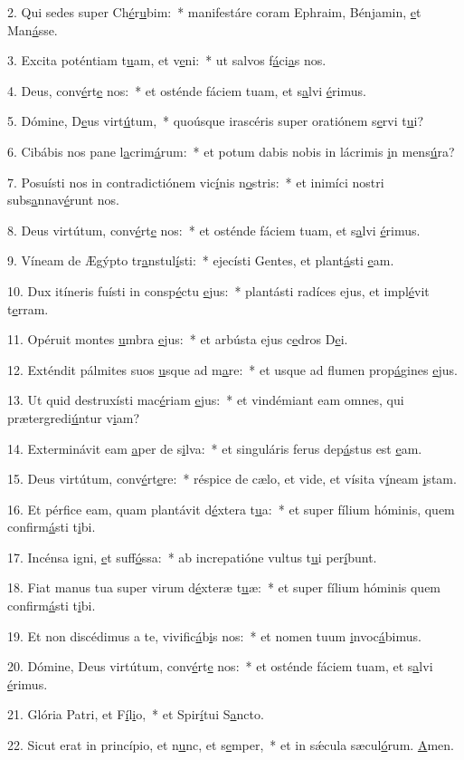2. Qui sedes super Ch\uline{é}r\uline{u}bim:~* manifestáre coram Ephraim, Bénjamin, \uline{e}t Man\uline{á}sse.\par 
3. Excita poténtiam t\uline{u}am, et v\uline{e}ni:~* ut salvos f\uline{á}ci\uline{a}s nos.\par 
4. Deus, conv\uline{é}rt\uline{e} nos:~* et osténde fáciem tuam, et s\uline{a}lvi \uline{é}rimus.\par 
5. Dómine, D\uline{e}us virt\uline{ú}tum,~* quoúsque irascéris super oratiónem s\uline{e}rvi t\uline{u}i?\par 
6. Cibábis nos pane l\uline{a}crim\uline{á}rum:~* et potum dabis nobis in lácrimis \uline{i}n mens\uline{ú}ra?\par 
7. Posuísti nos in contradictiónem vic\uline{í}nis n\uline{o}stris:~* et inimíci nostri subs\uline{a}nnav\uline{é}runt nos.\par 
8. Deus virtútum, conv\uline{é}rt\uline{e} nos:~* et osténde fáciem tuam, et s\uline{a}lvi \uline{é}rimus.\par 
9. Víneam de Ægýpto tr\uline{a}nstul\uline{í}sti:~* ejecísti Gentes, et plant\uline{á}sti \uline{e}am.\par 
10. Dux itíneris fuísti in consp\uline{é}ctu \uline{e}jus:~* plantásti radíces ejus, et impl\uline{é}vit t\uline{e}rram.\par 
11. Opéruit montes \uline{u}mbra \uline{e}jus:~* et arbústa ejus c\uline{e}dros D\uline{e}i.\par 
12. Exténdit pálmites suos \uline{u}sque ad m\uline{a}re:~* et usque ad flumen prop\uline{á}gines \uline{e}jus.\par 
13. Ut quid destruxísti mac\uline{é}riam \uline{e}jus:~* et vindémiant eam omnes, qui prætergredi\uline{ú}ntur v\uline{i}am?\par 
14. Exterminávit eam \uline{a}per de s\uline{i}lva:~* et singuláris ferus dep\uline{á}stus est \uline{e}am.\par 
15. Deus virtútum, conv\uline{é}rt\uline{e}re:~* réspice de cælo, et vide, et vísita v\uline{í}neam \uline{i}stam.\par 
16. Et pérfice eam, quam plantávit d\uline{é}xtera t\uline{u}a:~* et super fílium hóminis, quem confirm\uline{á}sti t\uline{i}bi.\par 
17. Incénsa igni, \uline{e}t suff\uline{ó}ssa:~* ab increpatióne vultus t\uline{u}i per\uline{í}bunt.\par 
18. Fiat manus tua super virum d\uline{é}xteræ t\uline{u}æ:~* et super fílium hóminis quem confirm\uline{á}sti t\uline{i}bi.\par 
19. Et non discédimus a te, vivific\uline{á}b\uline{i}s nos:~* et nomen tuum \uline{i}nvoc\uline{á}bimus.\par 
20. Dómine, Deus virtútum, conv\uline{é}rt\uline{e} nos:~* et osténde fáciem tuam, et s\uline{a}lvi \uline{é}rimus.\par 
21. Glória Patri, et F\uline{í}l\uline{i}o,~* et Spir\uline{í}tui S\uline{a}ncto.\par 
22. Sicut erat in princípio, et n\uline{u}nc, et s\uline{e}mper,~* et in sǽcula sæcul\uline{ó}rum. \uline{A}men.\par 
